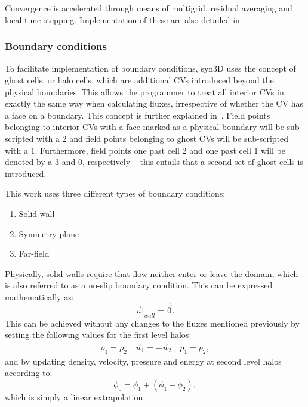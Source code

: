 Convergence is accelerated through means of multigrid, residual averaging and local time stepping. Implementation of these are also detailed in~\cite{nadarajah2003discrete}.
%
\subsubsection{Boundary conditions}
%
To facilitate implementation of boundary conditions, syn3D uses the concept of ghost cells, or halo cells, which are additional CVs introduced beyond the physical boundaries. This allows the programmer to treat all interior CVs in exactly the same way when calculating fluxes, irrespective of whether the CV has a face on a boundary. This concept is further explained in~\cite{blazek2015computational}. Field points belonging to interior CVs with a face marked as a physical boundary will be sub-scripted with a $2$ and field points belonging to ghost CVs will be sub-scripted with a $1$. Furthermore, field points one past cell 2 and one past cell 1 will be denoted by a 3 and 0, respectively -- this entails that a second set of ghost cells is introduced.

This work uses three different types of boundary conditions:
\begin{enumerate}
    \item Solid wall
    \item Symmetry plane
    \item Far-field
\end{enumerate}

Physically, solid walls require that flow neither enter or leave the domain, which is also referred to as a no-slip boundary condition. This can be expressed mathematically as:
\begin{equation*}
    \vec{u}|_{wall} = \vec{0}.
\end{equation*}
This can be achieved without any changes to the fluxes mentioned previously by setting the following values for the first level halos:
\begin{gather*}
    \rho_1 = \rho_2 \quad \vec{u}_1 = -\vec{u}_2 \quad p_1 = p_2,
\end{gather*}
and by updating density, velocity, pressure and energy at second level halos according to:
\begin{equation*}
    \phi_0 = \phi_1 + \left(\phi_1 - \phi_2\right),
\end{equation*}
which is simply a linear extrapolation.

